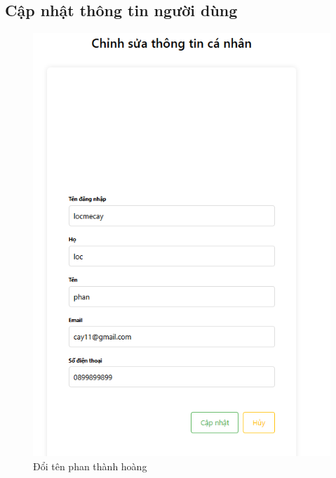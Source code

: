 \subsection{Cập nhật thông tin người dùng}
\begin{figure}[H]
    \centering
    \includegraphics[width=1\textwidth]{img/instagram/đổi tên phan thành hoàng.png}
    \caption{Đổi tên phan thành hoàng}
\end{figure}

\FloatBarrier %

